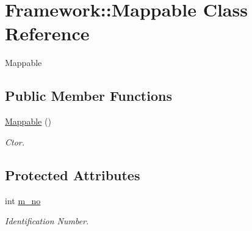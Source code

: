 \hypertarget{classFramework_1_1Mappable}{\section{\-Framework\-:\-:\-Mappable \-Class \-Reference}
\label{classFramework_1_1Mappable}
}


\-Mappable  


\subsection*{\-Public \-Member \-Functions}
\begin{DoxyCompactItemize}
\item 
\hypertarget{classFramework_1_1Mappable_a867b880446a03a36a3687c89d6571a48}{\hyperlink{classFramework_1_1Mappable_a867b880446a03a36a3687c89d6571a48}{\-Mappable} ()}\label{classFramework_1_1Mappable_a867b880446a03a36a3687c89d6571a48}

\begin{DoxyCompactList}\small\item\em \-Ctor. \end{DoxyCompactList}\end{DoxyCompactItemize}
\subsection*{\-Protected \-Attributes}
\begin{DoxyCompactItemize}
\item 
\hypertarget{classFramework_1_1Mappable_a3eed91c8c7e11e80e24ae253b14c7d5f}{int \hyperlink{classFramework_1_1Mappable_a3eed91c8c7e11e80e24ae253b14c7d5f}{m\-\_\-no}}\label{classFramework_1_1Mappable_a3eed91c8c7e11e80e24ae253b14c7d5f}

\begin{DoxyCompactList}\small\item\em \-Identification \-Number. \end{DoxyCompactList}\end{DoxyCompactItemize}

